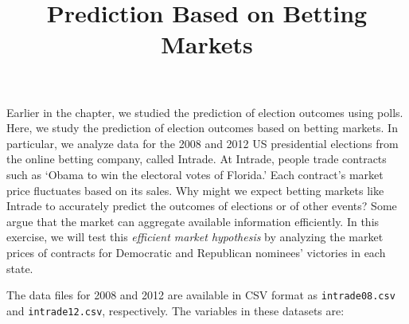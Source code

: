 \documentclass[]{article}
\title{Prediction Based on Betting Markets}
\author{}
\date{}
\begin{document}
\maketitle


Earlier in the chapter, we studied the prediction of election outcomes
using polls. Here, we study the prediction of election outcomes based on
betting markets. In particular, we analyze data for the 2008 and 2012 US
presidential elections from the online betting company, called Intrade.
At Intrade, people trade contracts such as `Obama to win the electoral
votes of Florida.' Each contract's market price fluctuates based on its
sales. Why might we expect betting markets like Intrade to accurately
predict the outcomes of elections or of other events? Some argue that
the market can aggregate available information efficiently. In this
exercise, we will test this \emph{efficient market hypothesis} by
analyzing the market prices of contracts for Democratic and Republican
nominees' victories in each state.

The data files for 2008 and 2012 are available in CSV format as
\texttt{intrade08.csv} and \texttt{intrade12.csv}, respectively. The
variables in these datasets are:
\end{document}

